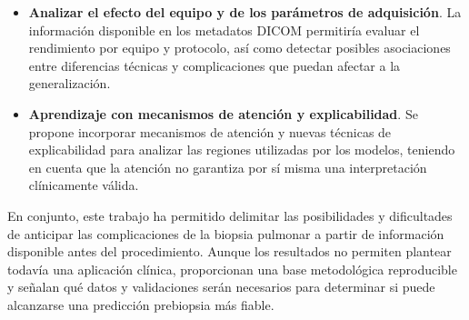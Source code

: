 \begin{itemize}
    \item \textbf{Analizar el efecto del equipo y de los parámetros de adquisición}. La información disponible en los metadatos DICOM permitiría evaluar el rendimiento por equipo y protocolo, así como detectar posibles asociaciones entre diferencias técnicas y complicaciones que puedan afectar a la generalización.

    \item \textbf{Aprendizaje con mecanismos de atención y explicabilidad}. Se propone incorporar mecanismos de atención y nuevas técnicas de explicabilidad para analizar las regiones utilizadas por los modelos, teniendo en cuenta que la atención no garantiza por sí misma una interpretación clínicamente válida.

\end{itemize}

En conjunto, este trabajo ha permitido delimitar las posibilidades y dificultades de anticipar las complicaciones de la biopsia pulmonar a partir de información disponible antes del procedimiento. Aunque los resultados no permiten plantear todavía una aplicación clínica, proporcionan una base metodológica reproducible y señalan qué datos y validaciones serán necesarios para determinar si puede alcanzarse una predicción prebiopsia más fiable.


\endinput
